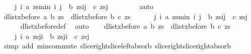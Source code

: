 \begin{isabellebody}
\ \ \ \ {\isacharparenleft}{\isasymexists}j{\isachardot}\ {\isacharparenleft}{\isasymexists}i{\isachardot}\ a\ {\isacharparenleft}zs{\isasymdagger}{\isachardot}{\isachardot}min\ i\ j{\isacharparenright}\ {\isasymand}\ b\ {\isacharparenleft}zs{\isasymdagger}i{\isachardot}{\isachardot}j{\isacharparenright}{\isacharparenright}\ {\isasymand}\ c\ {\isacharparenleft}zs{\isasymdagger}j{\isachardot}{\isachardot}{\isacharparenright}{\isacharparenright}{\isachardoublequoteclose}\isanewline
\ \ \ \ \isamarkupfalse%
\ {}\ \isamarkupfalse%
\ auto\isanewline
\ \ \isamarkupfalse%
\ {\isachardoublequoteopen}{\isacharparenleft}dlist{\isacharunderscore}xbefore\ a\ b\ zs\ {\isasymand}\ dlist{\isacharunderscore}xbefore\ b\ c\ zs{\isacharparenright}\ {\isasymlongleftrightarrow}\ \isanewline
\ \ \ \ {\isacharparenleft}{\isasymexists}j{\isachardot}\ {\isacharparenleft}{\isasymexists}i{\isachardot}\ a\ {\isacharparenleft}zs{\isasymdagger}{\isachardot}{\isachardot}min\ i\ j{\isacharparenright}\ {\isasymand}\ b\ {\isacharparenleft}zs{\isasymdagger}i{\isachardot}{\isachardot}j{\isacharparenright}{\isacharparenright}\ {\isasymand}\ c\ {\isacharparenleft}zs{\isasymdagger}j{\isachardot}{\isachardot}{\isacharparenright}{\isacharparenright}{\isachardoublequoteclose}\isanewline
\ \ \ \ \isamarkupfalse%
\ dlist{\isacharunderscore}xbefore{\isacharunderscore}def\ \isamarkupfalse%
\ auto\isanewline
\ \ \isamarkupfalse%
\ {\isachardoublequoteopen}{\isacharparenleft}dlist{\isacharunderscore}xbefore\ a\ b\ zs\ {\isasymand}\ dlist{\isacharunderscore}xbefore\ b\ c\ zs{\isacharparenright}\ {\isasymlongleftrightarrow}\ \isanewline
\ \ \ \ {\isacharparenleft}{\isasymexists}j{\isachardot}\ {\isacharparenleft}{\isasymexists}i{\isachardot}\ a\ {\isacharparenleft}{\isacharparenleft}zs{\isasymdagger}{\isachardot}{\isachardot}j{\isacharparenright}{\isasymdagger}{\isachardot}{\isachardot}i{\isacharparenright}\ {\isasymand}\ b\ {\isacharparenleft}{\isacharparenleft}zs{\isasymdagger}{\isachardot}{\isachardot}j{\isacharparenright}{\isasymdagger}i{\isachardot}{\isachardot}{\isacharparenright}{\isacharparenright}\ {\isasymand}\ c\ {\isacharparenleft}zs{\isasymdagger}j{\isachardot}{\isachardot}{\isacharparenright}{\isacharparenright}{\isachardoublequoteclose}\isanewline
\ \ \ \ \isamarkupfalse%
\ {\isacharparenleft}simp\ add{\isacharcolon}\ min{\isachardot}commute\ slice{\isacharunderscore}right{\isacharunderscore}slice{\isacharunderscore}left{\isacharunderscore}absorb\ slice{\isacharunderscore}right{\isacharunderscore}slice{\isacharunderscore}right{\isacharunderscore}absorb{\isacharparenright}\isanewline

\end{isabellebody}
